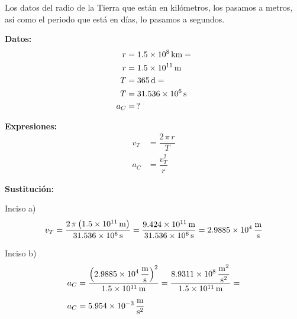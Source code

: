 \documentclass[14pt]{extarticle}
\begin{document}
\begin{enumerate}
Los datos del radio de la Tierra que están en kilómetros, los pasamos a metros, así como el periodo que está en días, lo pasamos a segundos.

\begin{minipage}[t]{0.4\linewidth}
\textbf{Datos:}
\begin{align*}
r &= \SI{1.5d8}{\kilo\meter} = \\
r &= \SI{1.5d11}{\meter} \\
T &= \SI{365}{\day} = \\
T &= \SI{31.536d6}{\second} \\
a_{C} &= \, ?
\end{align*}
\end{minipage}
\begin{minipage}[t]{0.4\linewidth}
\textbf{Expresiones:}
\begin{align*}
v_{T} &= \dfrac{2 \, \pi \, r}{T} \\[0.5em]
a_{C} &= \dfrac{v_{T}^{2}}{r}
\end{align*}
\end{minipage}


\textbf{Sustitución:}    

Inciso a)
\begin{align*}
v_{T} = \dfrac{2 \, \pi \left( \SI{1.5d11}{\meter} \right)}{ \SI{31.536d6}{\second} } = \dfrac{\SI{9.424d11}{\meter}}{\SI{31.536d6}{\second}} = \SI[per-mode=fraction]{2.9885d4}{\meter\per\second}
\end{align*}

Inciso b)
\begin{align*}
a_{C} &= \dfrac{\displaystyle \left( \SI[per-mode=fraction]{2.9885d4}{\meter\per\second} \right)^{2}}{\SI{1.5d11}{\meter}} = \dfrac{ \displaystyle \SI[per-mode=fraction]{8.9311d8}{\square\meter\per\square\second}}{\SI{1.5d11}{\meter}} = \\[0.5em]
a_{C} &= \SI[per-mode=fraction]{5.954d-3}{\meter\per\square\second}
\end{align*}
\end{enumerate}
\end{document}
